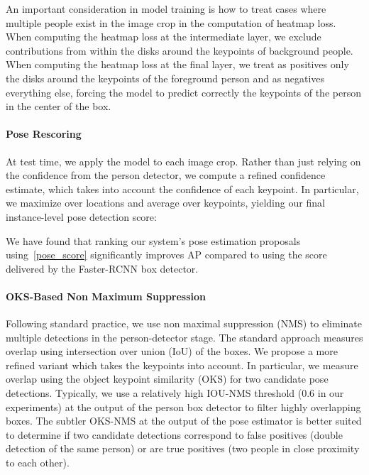 \documentclass[10pt,twocolumn,letterpaper]{article}
\begin{document}
An important consideration in model training is how to treat cases where multiple people exist in the image crop in the computation of heatmap loss. When computing the heatmap loss at the intermediate layer, we exclude contributions from within the disks around the keypoints of background people. When computing the heatmap loss at the final layer, we treat as positives only the disks around the keypoints of the foreground person and as negatives everything else, forcing the model to predict correctly the keypoints of the person in the center of the box.

\paragraph{Pose Rescoring}
At test time,  we apply the model to each image crop. Rather than just relying on the confidence from the person detector, we compute a refined confidence estimate, which takes into account the confidence of each keypoint. In particular, we maximize over locations and average over keypoints, yielding our final instance-level pose detection score:

We have found that ranking our system's pose estimation proposals using~\ref{pose_score} significantly improves AP compared to using the score delivered by the Faster-RCNN box detector.

\paragraph{OKS-Based Non Maximum Suppression}
Following standard practice, we use non maximal suppression (NMS) to eliminate multiple detections in the person-detector stage. The standard approach measures overlap using intersection over union (IoU) of the boxes. We propose a more refined variant which takes the keypoints into account. In particular, we measure overlap using the object keypoint similarity (OKS) for two candidate pose detections. Typically, we use a relatively high IOU-NMS threshold (0.6 in our experiments) at the output of the person box detector to filter highly overlapping boxes. The subtler OKS-NMS at the output of the pose estimator is better suited to determine if two candidate detections correspond to false positives (double detection of the same person) or are true positives (two people in close proximity to each other).
\end{document}

